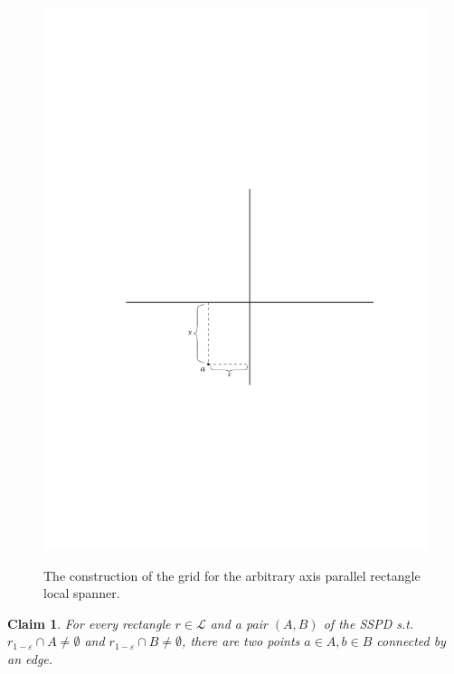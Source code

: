 \documentclass{article}
\newtheorem{claim}[theorem]{Claim}
\newcommand{\eps}{\varepsilon}
\newcommand{\LL}{\mathcal{L}}
\begin{document}
	\begin{figure}
		\centering
		\includegraphics[width=\linewidth, page=3]{grid_construction.pdf}
		\label{fig:grid_construction}
		\caption{The construction of the grid for the arbitrary axis parallel rectangle local spanner.}
	\end{figure}
	
	\begin{claim}
		For every rectangle $r\in \LL$ and a pair $(A,B)$ of the SSPD s.t. $r_{1-\eps}\cap A \neq \emptyset$ and $r_{1-\eps}\cap B \neq \emptyset$, there are two points $a\in A, b\in B$ connected by an edge.
	\end{claim}
	
\end{document}
